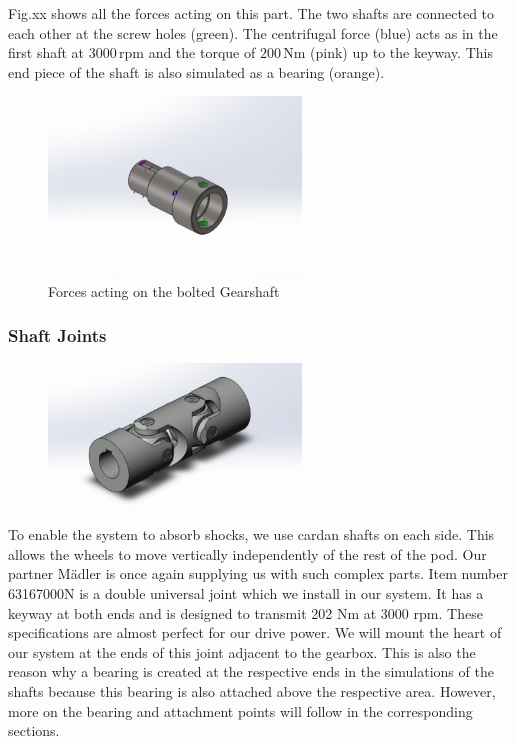 Fig.xx shows all the forces acting on this part. The two shafts are connected to each other at the screw holes (green). The centrifugal force (blue) acts as in the first shaft at \(3000 \, \text{rpm}\) and the torque of \(200 \, \text{Nm}\) (pink) up to the keyway. This end piece of the shaft is also simulated as a bearing (orange).

\begin{figure}[H]
\centering
\includegraphics[width=0.6\textwidth]{texfiles/mech/eimg/propulsion/picture_forces_gearshaft_left}
\caption{Forces acting on the bolted Gearshaft}
\label{fig:gearshaft_left_forces}
\end{figure}

\subsubsection{Shaft Joints}
\begin{figure}[H]
\centering
\includegraphics[width=0.6\textwidth]{texfiles/mech/eimg/propulsion/picture_shaft_joint}
\caption{}
\label{}
\end{figure}


To enable the system to absorb shocks, we use cardan shafts on each side. This allows the wheels to move vertically independently of the rest of the pod. Our partner Mädler is once again supplying us with such complex parts. Item number 63167000N is a double universal joint which we install in our system. It has a keyway at both ends and is designed to transmit 202 Nm at 3000 rpm. These specifications are almost perfect for our drive power.
We will mount the heart of our system at the ends of this joint adjacent to the gearbox. This is also the reason why a bearing is created at the respective ends in the simulations of the shafts because this bearing is also attached above the respective area.
However, more on the bearing and attachment points will follow in the corresponding sections.

